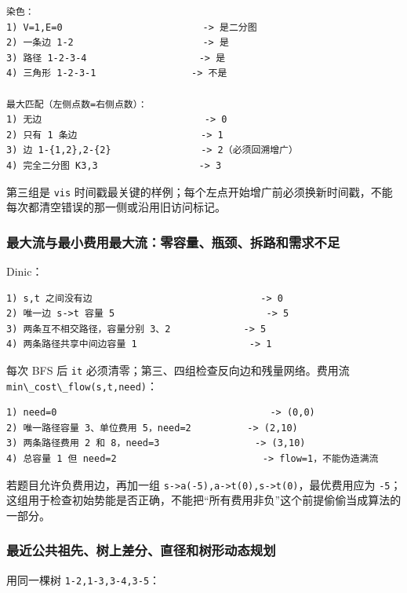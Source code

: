 \begin{lstlisting}
染色：
1) V=1,E=0                         -> 是二分图
2) 一条边 1-2                       -> 是
3) 路径 1-2-3-4                    -> 是
4) 三角形 1-2-3-1                 -> 不是

最大匹配（左侧点数=右侧点数）：
1) 无边                             -> 0
2) 只有 1 条边                      -> 1
3) 边 1-{1,2},2-{2}                -> 2（必须回溯增广）
4) 完全二分图 K3,3                  -> 3
\end{lstlisting}

第三组是 \passthrough{\lstinline!vis!} 时间戳最关键的样例；每个左点开始增广前必须换新时间戳，不能每次都清空错误的那一侧或沿用旧访问标记。

\subsubsection{最大流与最小费用最大流：零容量、瓶颈、拆路和需求不足}

Dinic：

\begin{lstlisting}
1) s,t 之间没有边                              -> 0
2) 唯一边 s->t 容量 5                           -> 5
3) 两条互不相交路径，容量分别 3、2             -> 5
4) 两条路径共享中间边容量 1                    -> 1
\end{lstlisting}

每次 BFS 后 \passthrough{\lstinline!it!} 必须清零；第三、四组检查反向边和残量网络。费用流 \passthrough{\lstinline!min\_cost\_flow(s,t,need)!}：

\begin{lstlisting}
1) need=0                                      -> (0,0)
2) 唯一路径容量 3、单位费用 5，need=2          -> (2,10)
3) 两条路径费用 2 和 8，need=3                 -> (3,10)
4) 总容量 1 但 need=2                          -> flow=1，不能伪造满流
\end{lstlisting}

若题目允许负费用边，再加一组 \passthrough{\lstinline!s->a(-5),a->t(0),s->t(0)!}，最优费用应为 \passthrough{\lstinline!-5!}；这组用于检查初始势能是否正确，不能把``所有费用非负''这个前提偷偷当成算法的一部分。

\subsubsection{最近公共祖先、树上差分、直径和树形动态规划}

用同一棵树 \passthrough{\lstinline!1-2,1-3,3-4,3-5!}：

